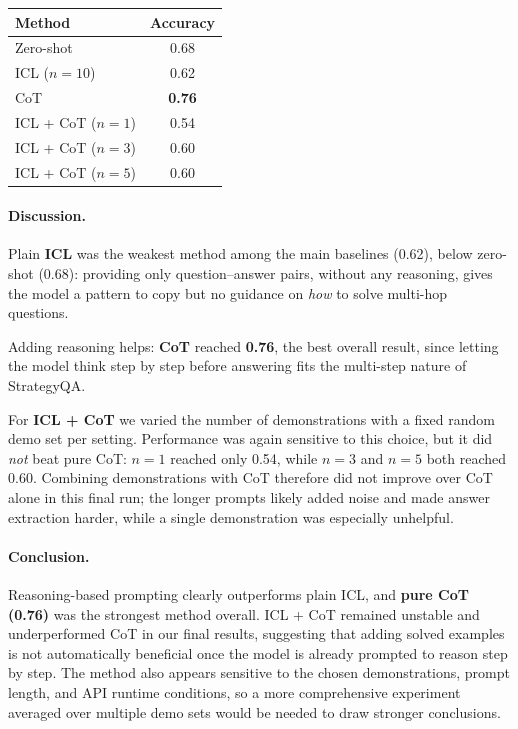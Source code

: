 \documentclass[11pt]{article}
\begin{document}
\begin{center}
\begin{tabular}{lc}
\hline
Method & Accuracy \\
\hline
Zero-shot          & 0.68 \\
ICL ($n=10$)       & 0.62 \\
CoT                & \textbf{0.76} \\
ICL + CoT ($n=1$)  & 0.54 \\
ICL + CoT ($n=3$)  & 0.60 \\
ICL + CoT ($n=5$)  & 0.60 \\
\hline
\end{tabular}
\end{center}

\paragraph{Discussion.}
Plain \textbf{ICL} was the weakest method among the main baselines (0.62), below zero-shot (0.68): providing only question--answer pairs, without any reasoning, gives the model a pattern to copy but no guidance on \emph{how} to solve multi-hop questions.

Adding reasoning helps: \textbf{CoT} reached \textbf{0.76}, the best overall result, since letting the model think step by step before answering fits the multi-step nature of StrategyQA.

For \textbf{ICL + CoT} we varied the number of demonstrations with a fixed random demo set per setting. Performance was again sensitive to this choice, but it did \emph{not} beat pure CoT: $n=1$ reached only 0.54, while $n=3$ and $n=5$ both reached 0.60. Combining demonstrations with CoT therefore did not improve over CoT alone in this final run; the longer prompts likely added noise and made answer extraction harder, while a single demonstration was especially unhelpful.

\paragraph{Conclusion.}
Reasoning-based prompting clearly outperforms plain ICL, and \textbf{pure CoT (0.76)} was the strongest method overall. ICL + CoT remained unstable and underperformed CoT in our final results, suggesting that adding solved examples is not automatically beneficial once the model is already prompted to reason step by step. The method also appears sensitive to the chosen demonstrations, prompt length, and API runtime conditions, so a more comprehensive experiment averaged over multiple demo sets would be needed to draw stronger conclusions.
\end{document}
